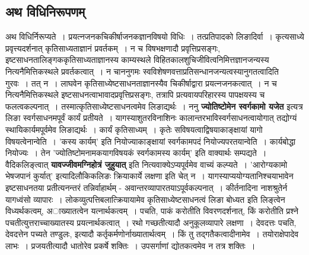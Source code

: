 \subsection*{अथ विधिनिरूपणम्}
	अथ विधिर्निरूप्यते~। प्रयत्नजनकचिकीर्षाजनकज्ञानविषयो विधिः~। तत्प्रतिपादको लिङादिर्वा~। कृत्यसाध्ये प्रवृत्त्यदर्शनात् कृतिसाध्यताज्ञानं प्रवर्तकम्~। न च विषभक्षणादौ प्रवृत्तिप्रसङ्गः, इष्टसाधनतालिङ्गककृतिसाध्यताज्ञानस्य काम्यस्थले विहितकालशुचिजीवित्वनिमित्तज्ञानजन्यस्य नित्यनैमित्तिकस्थले प्रवर्तकत्वात्~। न चाननुगमः स्वविशेषणवत्ताप्रतिसन्धानजन्यत्वस्यानुगतत्वादिति गुरवः~। तत् न~। लाघवेन कृतिसाध्येष्टसाधनताज्ञानस्यैव चिकीर्षाद्वारा प्रयत्नजनकत्वात्~। न च नित्यनैमित्तिकस्थले इष्टसाधनत्वाभावादप्रवृत्तिप्रसङ्गः, तत्रापि प्रत्यवायपरिहारस्य पापक्षयस्य च फलत्वकल्पनात्~। तस्मात्कृतिसाध्येष्टसाधनत्वमेव लिङाद्यर्थः~। ननु {\bfseries ज्योतिष्टोमेन स्वर्गकामो यजेत} इत्यत्र लिङा स्वर्गसाधनमपूर्वं कार्यं प्रतीयते~। यागस्याशुतरविनाशिनः कालान्तरभाविस्वर्गसाधनत्वायोगात् तद्योग्यं स्थायिकार्यमपूर्वमेव लिङाद्यर्थः~। कार्यं कृतिसाध्यम्~। कृतेः सविषयत्वाद्विषयाकाङ्क्षायां यागो विषयत्वेनान्वेति~। ’कस्य कार्यम्’ इति नियोज्याकाङ्क्षायां स्वर्गकामपदं नियोज्यपरतयान्वेति~। कार्यबोद्धा नियोज्यः~। तेन ’ज्योतिष्टोमनामकयागविषयकं स्वर्गकामस्य कार्यम्’ इति वाक्यार्थः सम्पद्यते~। वैदिकलिङ्त्वात् {\bfseries यावज्जीवमग्निहोत्रं जुहुयात्} इति नित्यवाक्येऽप्यपूर्वमेव वाच्यं कल्प्यते~। ’आरोग्यकामो भेषजपानं कुर्यात्’ इत्यादिलौकिकलिङः क्रियाकार्ये लक्षणा इति चेत् न~। यागस्याप्ययोग्यतानिश्चयाभावेन इष्टसाधनतया प्रतीत्यनन्तरं तन्निर्वाहार्थम् - अवान्तरव्यापारतयाऽपूर्वकल्पनात्~। कीर्तनादिना नाशश्रुतेर्न यागध्वंसो व्यापारः~। लोकव्युत्पत्तिबलात्क्रियायामेव कृतिसाध्येष्टसाधनत्वं लिङा बोध्यत इति लिङ्त्वेन विध्यर्थकत्वम्, अाख्यातत्वेन यत्नार्थकत्वम्~। पचति, पाकं करोतीति विवरणदर्शनात्, किं करोतीति प्रश्ने पचतीत्युत्तराच्चाख्यातस्य प्रयत्नार्थकत्वात्~। रथो गच्छतीत्यादौ अनुकूलव्यापारे लक्षणा~। देवदत्तः पचति, देवदत्तेन पच्यते तण्डुलः, इत्यादौ कर्तृकर्मणोर्नाख्यातार्थत्वम्~। किं तु तद्गतैकत्वादीनामेव~। तयोराक्षेपादेव लाभः~। प्रजयतीत्यादौ धातोरेव प्रकर्षे शक्तिः~। उपसर्गाणां द्योतकत्वमेव न तत्र शक्तिः~।
